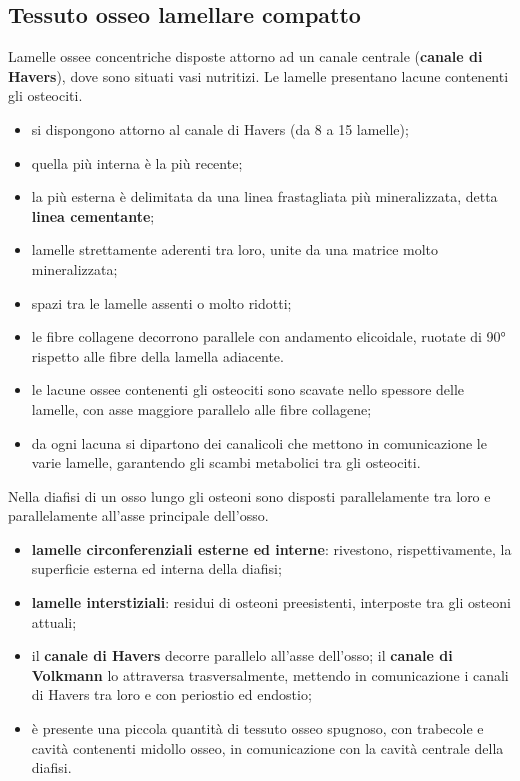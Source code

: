 \subsection{Tessuto osseo lamellare compatto}

Lamelle ossee concentriche disposte attorno ad un canale centrale (\textbf{canale di Havers}), dove sono situati vasi nutritizi. Le lamelle presentano lacune contenenti gli osteociti.

\begin{itemize}
  \item si dispongono attorno al canale di Havers (da 8 a 15 lamelle);
  \item quella più interna è la più recente;
  \item la più esterna è delimitata da una linea frastagliata più mineralizzata, detta \textbf{linea cementante};
  \item lamelle strettamente aderenti tra loro, unite da una matrice molto mineralizzata;
  \item spazi tra le lamelle assenti o molto ridotti;
  \item le fibre collagene decorrono parallele con andamento elicoidale, ruotate di 90° rispetto alle fibre della lamella adiacente.
\end{itemize}

\begin{itemize}
  \item le lacune ossee contenenti gli osteociti sono scavate nello spessore delle lamelle, con asse maggiore parallelo alle fibre collagene;
  \item da ogni lacuna si dipartono dei canalicoli che mettono in comunicazione le varie lamelle, garantendo gli scambi metabolici tra gli osteociti.
\end{itemize}

Nella diafisi di un osso lungo gli osteoni sono disposti parallelamente tra loro e parallelamente all'asse principale dell'osso.
\begin{itemize}
  \item \textbf{lamelle circonferenziali esterne ed interne}: rivestono, rispettivamente, la superficie esterna ed interna della diafisi;
  \item \textbf{lamelle interstiziali}: residui di osteoni preesistenti, interposte tra gli osteoni attuali;
  \item il \textbf{canale di Havers} decorre parallelo all'asse dell'osso; il \textbf{canale di Volkmann} lo attraversa trasversalmente, mettendo in comunicazione i canali di Havers tra loro e con periostio ed endostio;
  \item è presente una piccola quantità di tessuto osseo spugnoso, con trabecole e cavità contenenti midollo osseo, in comunicazione con la cavità centrale della diafisi.
\end{itemize}

